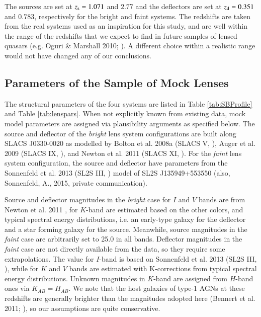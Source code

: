\documentclass[a4paper,11pt]{article}
\begin{document}
The sources are set at $z_{\rm s} = 1.071$ and $2.77$ and the
deflectors are set at $z_{\rm d} = 0.351$ and $0.783$, respectively
for the bright and faint systems. The redshifts are taken from the
real systems used as an inspiration for this study, and are well
within the range of the redshifts that we expect to find in future
samples of lensed quasars (e.g. Oguri \& Marshall 2010;
\cite{2010MNRAS.405.2579O}). A different choice within a realistic
range would not have changed any of our conclusions.


\subsection{Parameters of the Sample of Mock Lenses}

The structural parameters of the four systems are listed in Table
\ref{tab:SBProfile} and Table \ref{tab:lenspars}. When not explicitly known from existing data,
mock model parameters are assigned via plausibility arguments as
specified below. The source and deflector of the \textit{bright} lens
system configurations are built along SLACS J0330-0020 as modelled by
Bolton et al. 2008a (SLACS V, \cite{2008ApJ...682..964B}), Auger et
al. 2009 (SLACS IX, \cite{2009ApJ...705.1099A}), and Newton et
al. 2011 (SLACS XI, \cite{2011ApJ...734..104N}). For the
\textit{faint} lens system configuration, the source and deflector
have parameters from the Sonnenfeld et al. 2013 (SL2S III,
\cite{2013ApJ...777...97S}) model of SL2S J135949+553550
(also, Sonnenfeld, A., 2015, private communication).

Source and deflector magnitudes in the \textit{bright} case for $I$ and
$V$ bands are from Newton et al. 2011 \cite{2011ApJ...734..104N}, for
$K$-band are estimated based on the other colors, and typical spectral
energy distributions, i.e. an early-type galaxy for the deflector and
a star forming galaxy for the source. Meanwhile, source magnitudes in
the \textit{faint} case are arbitrarily set to 25.0 in all
bands. Deflector magnitudes in the \textit{faint} case are not
directly available from the data, so they require some
extrapolations. The value for $I$-band is based on Sonnenfeld et
al. 2013 (SL2S III,
\cite{2013ApJ...777...97S}), while for $K$ and $V$ bands are estimated
with K-corrections from typical spectral energy distributions. Unknown
magnitudes in $K$-band are assigned from $H$-band ones via
$K_{AB}=H_{AB}$. We note that the host galaxies of type-1 AGNs at
these redshifts are generally brighter than the magnitudes adopted
here (Bennert et al. 2011; \cite{2011ApJ...742..107B}), so our
assumptions are quite conservative.
\end{document}
